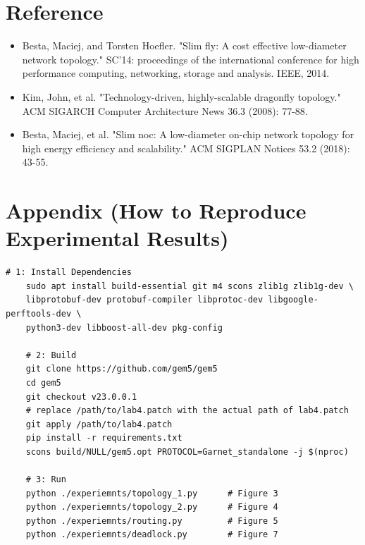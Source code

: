 \documentclass[utf8]{article}
\begin{document}
\section{Reference}
\begin{itemize}
    \item Besta, Maciej, and Torsten Hoefler. "Slim fly: A cost effective low-diameter network topology." SC'14: proceedings of the international conference for high performance computing, networking, storage and analysis. IEEE, 2014.
    \item Kim, John, et al. "Technology-driven, highly-scalable dragonfly topology." ACM SIGARCH Computer Architecture News 36.3 (2008): 77-88.
    \item Besta, Maciej, et al. "Slim noc: A low-diameter on-chip network topology for high energy efficiency and scalability." ACM SIGPLAN Notices 53.2 (2018): 43-55.
\end{itemize}

\section*{Appendix (How to Reproduce Experimental Results)}
\begin{Verbatim}[frame=single]
    # 1: Install Dependencies
    sudo apt install build-essential git m4 scons zlib1g zlib1g-dev \
    libprotobuf-dev protobuf-compiler libprotoc-dev libgoogle-perftools-dev \
    python3-dev libboost-all-dev pkg-config

    # 2: Build
    git clone https://github.com/gem5/gem5
    cd gem5
    git checkout v23.0.0.1
    # replace /path/to/lab4.patch with the actual path of lab4.patch
    git apply /path/to/lab4.patch
    pip install -r requirements.txt
    scons build/NULL/gem5.opt PROTOCOL=Garnet_standalone -j $(nproc)

    # 3: Run
    python ./experiemnts/topology_1.py      # Figure 3
    python ./experiemnts/topology_2.py      # Figure 4
    python ./experiemnts/routing.py         # Figure 5
    python ./experiemnts/deadlock.py        # Figure 7

\end{Verbatim}
\end{document}
